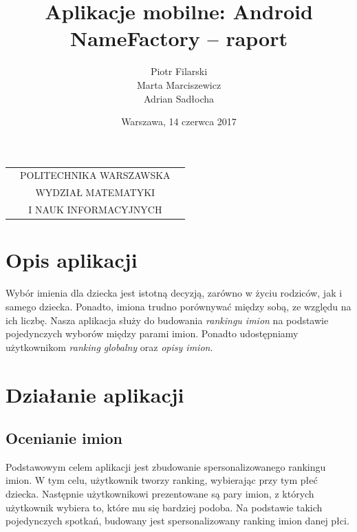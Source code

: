 \documentclass[12pt,a4paper]{article}
\begin{document}
\begin{table}[t]
\centering
\begin{tabular}[t]{lcr}
& POLITECHNIKA WARSZAWSKA & \\
& WYDZIAŁ MATEMATYKI & \\
& I NAUK INFORMACYJNYCH &
\end{tabular}
\end{table}

\author{Piotr Filarski \\ Marta Marciszewicz \\ Adrian Sadłocha}
\title{Aplikacje mobilne: Android \\ NameFactory -- raport}
\date{Warszawa, 14 czerwca 2017}

\maketitle

\section*{Opis aplikacji}
Wybór imienia dla dziecka jest istotną decyzją, zarówno w życiu rodziców, jak i samego dziecka.
Ponadto, imiona trudno porównywać między sobą, ze względu na ich liczbę.
Nasza aplikacja służy do budowania \textit{rankingu imion} na podstawie pojedynczych wyborów między parami imion.
Ponadto udostępniamy użytkownikom \textit{ranking globalny} oraz \textit{opisy imion}.
\newpage

\section{Działanie aplikacji}
\subsection{Ocenianie imion}

Podstawowym celem aplikacji jest zbudowanie spersonalizowanego rankingu imion.
W tym celu, użytkownik tworzy ranking, wybierając przy tym płeć dziecka.
Następnie użytkownikowi prezentowane są pary imion, z których użytkownik wybiera to, które mu się bardziej podoba.
Na podstawie takich pojedynczych spotkań, budowany jest spersonalizowany ranking imion danej płci.
\end{document}
